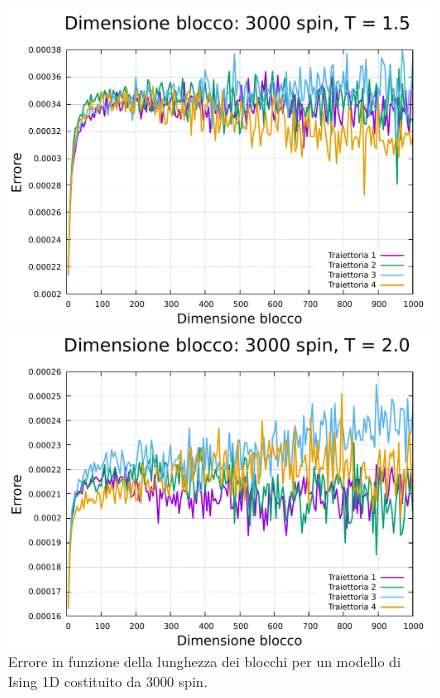 \begin{figure}[htbp]
    \begin{minipage}{0.45\textwidth}  
      \centering
      \includegraphics[page=1, width=\textwidth]{Immagini/simIsing1D/magn0.0/lblk/err_3000_1.5.pdf}
      \caption{$T\,=\,1.5$}
    \end{minipage}\hfill
    \begin{minipage}{0.45\textwidth}  
      \centering
      \includegraphics[page=1, width=\textwidth]{Immagini/simIsing1D/magn0.0/lblk/err_3000_2.0.pdf}
      \caption{$T\,=\,2.0$}
    \end{minipage}
    \caption{Errore in funzione della lunghezza dei blocchi per un modello di Ising 1D costituito da 3000 spin.}
\end{figure}

